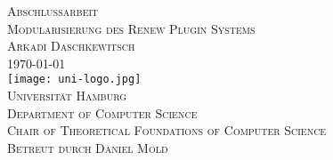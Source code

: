 \begin{titlepage}
\begin{center}
	\vspace{6em}
	{\Large \textsc{Abschlussarbeit}}\\
	\vspace{5em}
	{\huge \textsc{Modularisierung des Renew Plugin Systems}}\\
	\vspace{4em}
	{\Large \textsc{Arkadi Daschkewitsch}}\\
	\vspace{3em}
	{\Large \textsc{\today}}\\
	\vspace{3em}
	\texttt{[image: uni-logo.jpg]}\\
	\vspace{3em}
	{\Large \textsc{Universität Hamburg}}\\
	\vspace{1em}
	{\Large \textsc{Department of Computer Science}}\\
	\vspace{1em}
	{\Large \textsc{Chair of Theoretical Foundations of Computer Science}}\\
	\vspace{2em}
	{\Large \textsc{Betreut durch Daniel Mold}}\\
	
\end{center}
\end{titlepage}